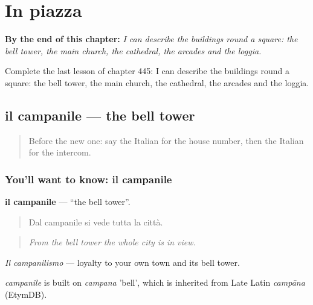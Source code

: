 
\chapter{In piazza}
\label{ch:it-in-piazza}

\begin{chapteropening}
\textbf{By the end of this chapter:} \emph{I can describe the buildings round a square: the bell tower, the main church, the cathedral, the arcades and the loggia.}

Complete the last lesson of chapter 445: I can describe the buildings round a square: the bell tower, the main church, the cathedral, the arcades and the loggia.
\end{chapteropening}

\section[il campanile]{il campanile — the bell tower}

\label{lesson:IT-C445-campanile}



\begin{quote}
Before the new one: say the Italian for the house number, then the Italian for the intercom.
\end{quote}

\subsection*{You'll want to know: il campanile}
\textbf{il campanile} — \textquotedblleft{}the bell tower\textquotedblright{}.

\begin{quote}
Dal campanile si vede tutta la città.
\end{quote}

\begin{quote}
\emph{From the bell tower the whole city is in view.}
\end{quote}

\emph{Il campanilismo} — loyalty to your own town and its bell tower.

\begin{cousinweb}
\emph{campanile} is built on \emph{campana} 'bell', which is inherited from Late Latin \emph{campāna} (EtymDB).
\end{cousinweb}


